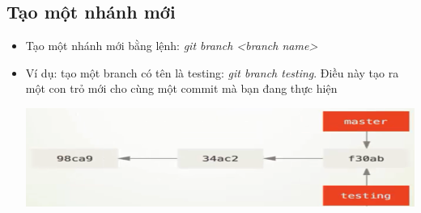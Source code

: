 \documentclass[12pt,a4paper]{report}
\begin{document}
\subsection{Tạo một nhánh mới}
\begin{itemize}
\item Tạo một nhánh mới bằng lệnh: {\it git branch <branch name>}
\item Ví dụ: tạo một branch có tên là testing: \textit{git branch testing}. Điều này tạo ra một con trỏ mới cho cùng một commit mà bạn đang thực hiện

	\includegraphics[width=0.8\linewidth]{screenshot051}

	\label{fig:screenshot051}

\end{itemize}
\end{document}
